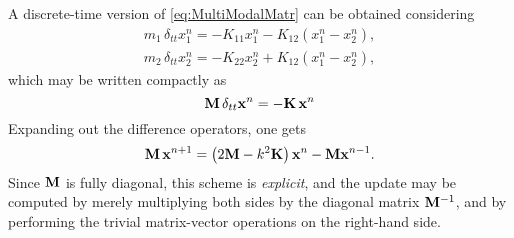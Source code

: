 \documentclass[11pt,twoside,a4paper,english]{book}
\newcommand{\dtt}{\delta_{tt}}
\begin{document}
A discrete-time version of \eqref{eq:MultiModalMatr} can be obtained considering
\begin{subequations}\label{eq:TwoMassFD1}
\begin{align}
m_1 \, \dtt x_1^n = -K_{11}x_1^n - K_{12}(x_1^n - x_2^n), \label{eq:CouplFD1} \\
m_2 \, \dtt x_2^n = -K_{22}x_2^n + K_{12}(x_1^n - x_2^n), \label{eq:CouplFD2}
\end{align}
\end{subequations} 
which may be written compactly as
\begin{equation}\label{eq:TwoMassFD1Compact}
{\bf M}\, \dtt {\bf x}^n = - {\bf K}\, {\bf x}^n
\end{equation}
Expanding out the difference operators, one gets
\begin{equation}\label{eq:updateExplicitScheme}
{\bf M}\, {\bf x}^{n+1} = \left(2{\bf M}-k^2{\bf K}\right){\bf x}^n - {\bf M}{\bf x}^{n-1}.
\end{equation}
Since ${\bf M}$ is fully diagonal, this scheme is \emph{explicit}, and the update may be computed by merely multiplying both sides by the diagonal matrix ${\bf M}^{-1}$, and by performing the trivial matrix-vector operations on the right-hand side. 
\end{document}
